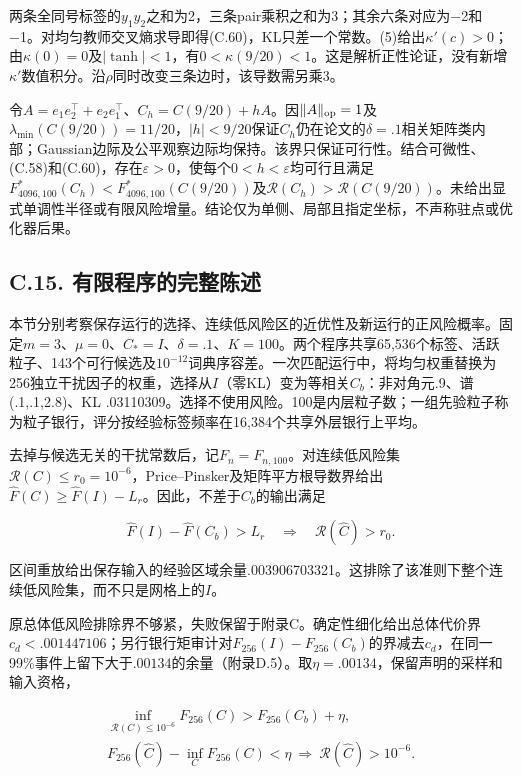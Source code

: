 \documentclass[11pt,a4paper]{article}
\begin{document}
两条全同号标签的\(y_1y_2\)之和为2，三条pair乘积之和为3；其余六条对应为−2和−1。对均匀教师交叉熵求导即得(C.60)，KL只差一个常数。(5)给出\(\kappa'(c)>0\)；由\(\kappa(0)=0\)及\(|\tanh|<1\)，有\(0<\kappa(9/20)<1\)。这是解析正性论证，没有新增\(\kappa'\)数值积分。沿\(\rho\)同时改变三条边时，该导数需另乘3。

令\(A=e_1e_2^\top+e_2e_1^\top\)、\(C_h=C(9/20)+hA\)。因\(\|A\|_{\rm op}=1\)及\(\lambda_{\min}(C(9/20))=11/20\)，\(|h|<9/20\)保证\(C_h\)仍在论文的\(\delta=.1\)相关矩阵类内部；Gaussian边际及公平观察边际均保持。该界只保证可行性。结合可微性、(C.58)和(C.60)，存在\(\varepsilon>0\)，使每个\(0<h<\varepsilon\)均可行且满足\(F_{4096,100}^*(C_h)<F_{4096,100}^*(C(9/20))\)及\(\mathcal R(C_h)>\mathcal R(C(9/20))\)。未给出显式单调性半径或有限风险增量。结论仅为单侧、局部且指定坐标，不声称驻点或优化器后果。

\subsection*{C.15. 有限程序的完整陈述}\label{finite-evidence-summary}

本节分别考察保存运行的选择、连续低风险区的近优性及新运行的正风险概率。固定\(m=3\)、\(\mu=0\)、\(C_*=I\)、\(\delta=.1\)、\(K=100\)。两个程序共享65,536个标签、活跃粒子、143个可行候选及\(10^{-12}\)词典序容差。一次匹配运行中，将均匀权重替换为256独立干扰因子的权重，选择从\(I\)（零KL）变为等相关\(C_b\)：非对角元.9、谱(.1,.1,2.8)、KL
.03110309。选择不使用风险。100是内层粒子数；一组先验粒子称为粒子银行，评分按经验标签频率在16,384个共享外层银行上平均。

去掉与候选无关的干扰常数后，记\(F_n=F_{n,100}\)。对连续低风险集\(\mathcal R(C)\le r_0=10^{-6}\)，Price--Pinsker及矩阵平方根导数界给出\(\widehat F(C)\ge\widehat F(I)-L_r\)。因此，不差于\(C_b\)的输出满足

\[
\widehat F(I)-\widehat F(C_b)>L_r
\quad\Longrightarrow\quad \mathcal R(\widehat C)>r_0.
\]

区间重放给出保存输入的经验区域余量.003906703321。这排除了该准则下整个连续低风险集，而不只是网格上的\(I\)。

原总体低风险排除界不够紧，失败保留于附录C。确定性细化给出总体代价界\(c_d<.001447106\)；另行银行矩审计对\(F_{256}(I)-F_{256}(C_b)\)的界减去\(c_d\)，在同一99\%事件上留下大于\(.00134\)的余量（附录D.5）。取\(\eta=.00134\)，保留声明的采样和输入资格，

\[
\begin{gathered}
\inf_{\mathcal R(C)\le10^{-6}}F_{256}(C)
>F_{256}(C_b)+\eta,\\
F_{256}(\widehat C)-\inf_C F_{256}(C)<\eta
\ \Longrightarrow\ \mathcal R(\widehat C)>10^{-6}.
\end{gathered}
\]
\end{document}
